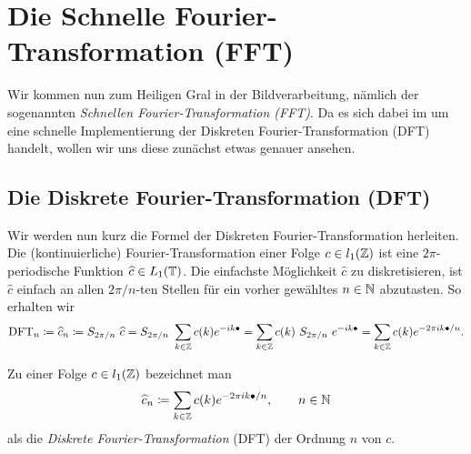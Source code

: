 \section{Die Schnelle Fourier-Transformation (FFT)}

Wir kommen nun zum Heiligen Gral in der Bildverarbeitung, nämlich der sogenannten \emph{Schnellen 
Fourier-Transformation (FFT)}. Da es sich dabei im um eine schnelle Implementierung der Diskreten 
Fourier-Transformation (DFT) handelt, wollen wir uns diese zunächst etwas genauer ansehen.

\subsection{Die Diskrete Fourier-Transformation (DFT)}

Wir werden nun kurz die Formel der Diskreten Fourier-Transformation herleiten. Die 
(kontinuierliche) Fourier-Transformation einer Folge $ c \in l_{1}(\mathbb{Z}) $ ist eine
$ 2\pi $-periodische Funktion $ \widehat{c} \in L_{1}(\mathbb{T}) $. Die einfachste Möglichkeit
$ \widehat{c} $ zu diskretisieren, ist $ \widehat{c} $ einfach an allen $ 2\pi / n $-ten Stellen 
für ein vorher gewähltes $ n \in \mathbb{N} $ abzutasten. So erhalten wir
\[
    \operatorname{DFT}_{n}
  \coloneq \widehat{c}_{n}
  \coloneq S_{2\pi / n} \ \widehat{c}
  = S_{2\pi / n} \ \sum_{k \in \mathbb{Z}} c(k) e^{-ik\bullet}
  = \sum_{k \in \mathbb{Z}} c(k) \ S_{2\pi / n} \ e^{-ik\bullet}
  = \sum_{k \in \mathbb{Z}} c(k) e^{-2\pi ik\bullet / n}.
\]

\begin{definition}
Zu einer Folge $ c \in l_{1}(\mathbb{Z}) $ bezeichnet man
\[
  \widehat{c}_{n} \coloneq \sum_{k \in \mathbb{Z}} c(k) e^{-2\pi ik\bullet / n}, \qquad n \in \mathbb{N}
\]
als die \emph{Diskrete Fourier-Transformation} (DFT) der Ordnung $ n $ von $ c $.
\end{definition}

